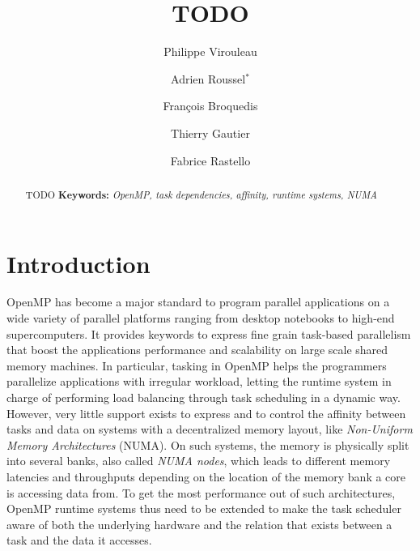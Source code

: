 \documentclass{Styles/llncs}
\begin{document}
\title{TODO}
\author{
  Philippe Virouleau \and Adrien Roussel$^{*}$ \and François Broquedis \and Thierry Gautier \and Fabrice Rastello
 \vspace*{-1ex}}
\date{}
\maketitle

\begin{abstract}
  \vspace*{-5ex} TODO
\smallskip
  \noindent\textbf{Keywords:}
  \emph{
    OpenMP, task dependencies, affinity, runtime systems, NUMA
  }
\end{abstract}


\section{Introduction}

OpenMP has become a major standard to program parallel applications on a wide variety of parallel platforms ranging from desktop notebooks to high-end supercomputers. It provides keywords to express fine grain task-based parallelism that boost the applications performance and scalability on large scale shared memory machines. In particular, tasking in OpenMP helps the programmers parallelize applications with irregular workload, letting the runtime system in charge of performing load balancing through task scheduling in a dynamic way. However, very little support exists to express and to control the affinity between tasks and data on systems with a decentralized memory layout, like \emph{Non-Uniform Memory Architectures} (NUMA). On such systems, the memory is physically split into several banks, also called \emph{NUMA nodes}, which leads to different memory latencies and throughputs depending on the location of the memory bank a core is accessing data from. To get the most performance out of such architectures, OpenMP runtime systems thus need to be extended to make the task scheduler aware of both the underlying hardware and the relation that exists between a task and the data it accesses.
\end{document}

